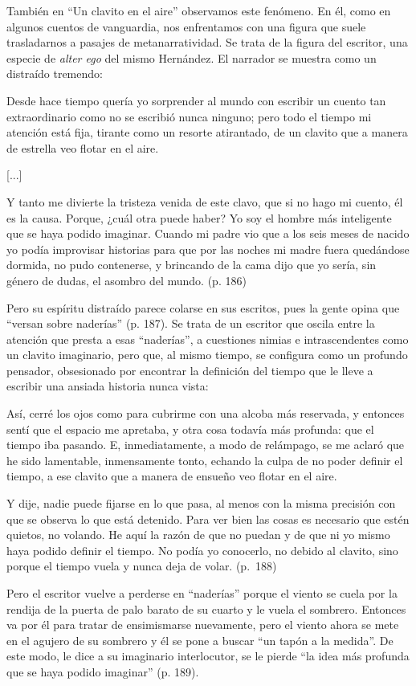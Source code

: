\documentclass[14pt,twoside,final]{extbook} %
\begin{document}
También en ``Un clavito en el aire'' observamos este fenómeno. En él, como en algunos cuentos de vanguardia, nos enfrentamos con una figura que suele trasladarnos a pasajes de metanarratividad. Se trata de la figura del escritor, una especie de \emph{alter ego} del mismo Hernández. El narrador se muestra como un distraído tremendo:
\begin{quoting}
Desde hace tiempo quería yo sorprender al mundo con escribir un cuento tan extraordinario como no se escribió nunca ninguno; pero todo el tiempo mi atención está fija, tirante como un resorte atirantado, de un clavito que a manera de estrella veo flotar en el aire. 

\centerline{[...]}

Y tanto me divierte la tristeza venida de este clavo, que si no hago mi cuento, él es la causa. Porque, ¿cuál otra puede haber? Yo soy el hombre más inteligente que se haya podido imaginar. Cuando mi padre vio que a los seis meses de nacido yo podía improvisar historias para que por las noches mi madre fuera quedándose dormida, no pudo contenerse, y brincando de la cama dijo que yo sería, sin género de dudas, el asombro del mundo. (p. 186)
\end{quoting}
Pero su espíritu distraído parece colarse en sus escritos, pues la gente opina que ``versan sobre naderías'' (p. 187). Se trata de un escritor que oscila entre la atención que presta a esas ``naderías'', a cuestiones nimias e intrascendentes como un clavito imaginario, pero que, al mismo tiempo, se configura como un profundo pensador, obsesionado por encontrar la definición del tiempo que le lleve a escribir una ansiada historia nunca vista:
\begin{quoting}
Así, cerré los ojos como para cubrirme con una alcoba más reservada, y entonces sentí que el espacio me apretaba, y otra cosa todavía más profunda: que el tiempo iba pasando. E, inmediatamente, a modo de relámpago, se me aclaró que he sido lamentable, inmensamente tonto, echando la culpa de no poder definir el tiempo, a ese clavito que a manera de ensueño veo flotar en el aire.

Y dije, nadie puede fijarse en lo que pasa, al menos con la misma precisión con que se observa lo que está detenido. Para ver bien las cosas es necesario que estén quietos, no volando. He aquí la razón de que no puedan y de que ni yo mismo haya podido definir el tiempo. No podía yo conocerlo, no debido al clavito, sino porque el tiempo vuela y nunca deja de volar. (p.~188)
\end{quoting}
Pero el escritor vuelve a perderse en ``naderías'' porque el viento se cuela por la rendija de la puerta de palo barato de su cuarto y le vuela el sombrero. Entonces va por él para tratar de ensimismarse nuevamente, pero el viento ahora se mete en el agujero de su sombrero y él se pone a buscar ``un tapón a la medida''. De este modo, le dice a su imaginario interlocutor, se le pierde ``la idea más profunda que se haya podido imaginar'' (p. 189).
\end{document}
